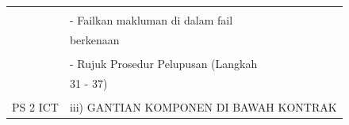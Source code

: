 \documentclass[
]{article}
\begin{document}
\begin{longtable}[]{@{}ll@{}}
\begin{minipage}[t]{0.23\columnwidth}\raggedright
\strut
\end{minipage} & \begin{minipage}[t]{0.71\columnwidth}\raggedright
\strut
\end{minipage}\tabularnewline
\begin{minipage}[t]{0.23\columnwidth}\raggedright
\strut
\end{minipage} & \begin{minipage}[t]{0.71\columnwidth}\raggedright
- Failkan makluman di dalam fail\strut
\end{minipage}\tabularnewline
\begin{minipage}[t]{0.23\columnwidth}\raggedright
\strut
\end{minipage} & \begin{minipage}[t]{0.71\columnwidth}\raggedright
berkenaan\strut
\end{minipage}\tabularnewline
\begin{minipage}[t]{0.23\columnwidth}\raggedright
\strut
\end{minipage} & \begin{minipage}[t]{0.71\columnwidth}\raggedright
\strut
\end{minipage}\tabularnewline
\begin{minipage}[t]{0.23\columnwidth}\raggedright
\strut
\end{minipage} & \begin{minipage}[t]{0.71\columnwidth}\raggedright
- Rujuk Prosedur Pelupusan (Langkah\strut
\end{minipage}\tabularnewline
\begin{minipage}[t]{0.23\columnwidth}\raggedright
\strut
\end{minipage} & \begin{minipage}[t]{0.71\columnwidth}\raggedright
31 - 37)\strut
\end{minipage}\tabularnewline
\begin{minipage}[t]{0.23\columnwidth}\raggedright
\strut
\end{minipage} & \begin{minipage}[t]{0.71\columnwidth}\raggedright
\strut
\end{minipage}\tabularnewline
\begin{minipage}[t]{0.23\columnwidth}\raggedright
PS 2 ICT\strut
\end{minipage} & \begin{minipage}[t]{0.71\columnwidth}\raggedright
iii) GANTIAN KOMPONEN DI BAWAH KONTRAK\strut

\end{minipage}
\end{longtable}
\end{document}
